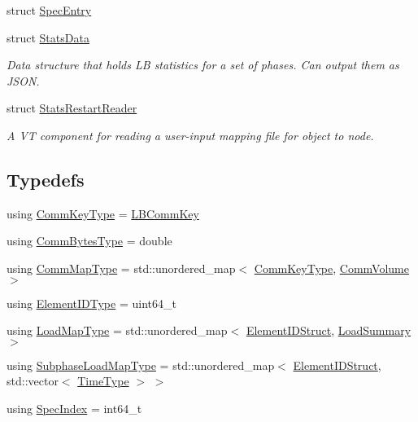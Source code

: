 \begin{DoxyCompactItemize}
struct \hyperlink{structvt_1_1vrt_1_1collection_1_1balance_1_1_spec_entry}{Spec\+Entry}
\item 
struct \hyperlink{structvt_1_1vrt_1_1collection_1_1balance_1_1_stats_data}{Stats\+Data}
\begin{DoxyCompactList}\small\item\em Data structure that holds LB statistics for a set of phases. Can output them as J\+S\+ON. \end{DoxyCompactList}\item 
struct \hyperlink{structvt_1_1vrt_1_1collection_1_1balance_1_1_stats_restart_reader}{Stats\+Restart\+Reader}
\begin{DoxyCompactList}\small\item\em A VT component for reading a user-\/input mapping file for object to node. \end{DoxyCompactList}\end{DoxyCompactItemize}
\subsection*{Typedefs}
\begin{DoxyCompactItemize}
\item 
using \hyperlink{namespacevt_1_1vrt_1_1collection_1_1balance_a01c9a1060d83d052604a3ff12918033a}{Comm\+Key\+Type} = \hyperlink{structvt_1_1vrt_1_1collection_1_1balance_1_1_l_b_comm_key}{L\+B\+Comm\+Key}
\item 
using \hyperlink{namespacevt_1_1vrt_1_1collection_1_1balance_a0772d7dd137393e9874b9f8caa96d420}{Comm\+Bytes\+Type} = double
\item 
using \hyperlink{namespacevt_1_1vrt_1_1collection_1_1balance_a10860c956804d644db54a16012352728}{Comm\+Map\+Type} = std\+::unordered\+\_\+map$<$ \hyperlink{namespacevt_1_1vrt_1_1collection_1_1balance_a01c9a1060d83d052604a3ff12918033a}{Comm\+Key\+Type}, \hyperlink{structvt_1_1vrt_1_1collection_1_1balance_1_1_comm_volume}{Comm\+Volume} $>$
\item 
using \hyperlink{namespacevt_1_1vrt_1_1collection_1_1balance_a14c8d2c972f2913aa3f1636e5be0a120}{Element\+I\+D\+Type} = uint64\+\_\+t
\item 
using \hyperlink{namespacevt_1_1vrt_1_1collection_1_1balance_a5339303db2e1ce964d783a53fd74e6b1}{Load\+Map\+Type} = std\+::unordered\+\_\+map$<$ \hyperlink{structvt_1_1vrt_1_1collection_1_1balance_1_1_element_i_d_struct}{Element\+I\+D\+Struct}, \hyperlink{structvt_1_1vrt_1_1collection_1_1balance_1_1_load_summary}{Load\+Summary} $>$
\item 
using \hyperlink{namespacevt_1_1vrt_1_1collection_1_1balance_a8bdadb2583f128dd256e7d5a10826542}{Subphase\+Load\+Map\+Type} = std\+::unordered\+\_\+map$<$ \hyperlink{structvt_1_1vrt_1_1collection_1_1balance_1_1_element_i_d_struct}{Element\+I\+D\+Struct}, std\+::vector$<$ \hyperlink{namespacevt_a876a9d0cd5a952859c72de8a46881442}{Time\+Type} $>$ $>$
\item 
using \hyperlink{namespacevt_1_1vrt_1_1collection_1_1balance_a72a5e0d9936ddf57f8e6c64e0e9fd123}{Spec\+Index} = int64\+\_\+t
\end{DoxyCompactItemize}
